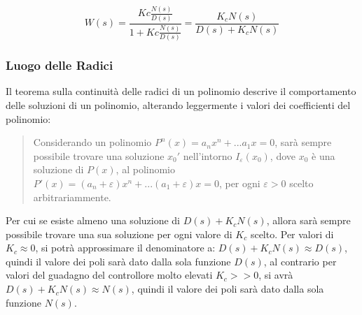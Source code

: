 \documentclass{article}
\numberwithin{equation}{subsection}
\begin{document}
\begin{equation}
    W(s)=\displaystyle\frac{Kc\displaystyle\frac{N(s)}{D(s)}}{1+Kc\displaystyle\frac{N(s)}{D(s)}}=\frac{K_cN(s)}{D(s)+K_cN(s)}
\end{equation}

\begin{center}\end{center}

\subsubsection{Luogo delle Radici}

Il teorema sulla continuità delle radici di un polinomio descrive il comportamento delle soluzioni di un polinomio, alterando leggermente i 
valori dei coefficienti del polinomio:
\begin{quotation}
    Considerando un polinomio $P^n(x)=a_nx^n+...a_1x=0$, sarà sempre possibile trovare una soluzione $x_0'$ nell'intorno $I_{\varepsilon}(x_0)$, dove $x_0$ 
    è una soluzione di $P(x)$, al polinomio $P'(x)=(a_n+\varepsilon)x^n+...(a_1+\varepsilon)x=0$, per ogni $\varepsilon>0$ scelto arbitrariammente. 
\end{quotation} 
Per cui se esiste almeno una soluzione di $D(s)+K_cN(s)$, allora sarà sempre possibile trovare una sua soluzione per ogni valore di $K_c$ scelto. 
Per valori di $K_c\approx0$, si potrà approssimare il denominatore a: $D(s)+K_cN(s)\approx D(s)$, quindi il valore dei poli sarà dato dalla sola 
funzione $D(s)$, al contrario per valori del guadagno del controllore molto elevati  $K_c>>0$, si avrà $D(s)+K_cN(s)\approx N(s)$, quindi il valore 
dei poli sarà dato dalla sola funzione $N(s)$.
\end{document}
